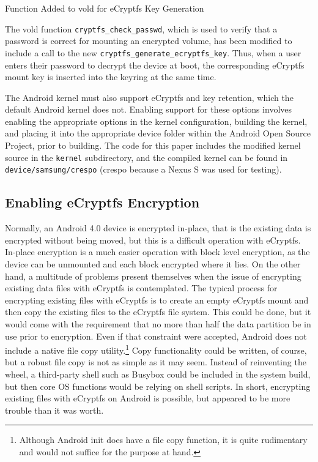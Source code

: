 \begin{table}[!htb]
 
\caption{Function Added to vold for eCryptfs Key Generation}
\label{tab:generate-key}
\end{table}

The vold function \texttt{cryptfs\_check\_passwd}, which is used to verify that a password is correct for mounting an
encrypted volume, has been modified to include a call to the new \texttt{cryptfs\_generate\_ecryptfs\_key}. Thus, when a user enters
their password to decrypt the device at boot, the corresponding eCryptfs mount key is inserted into the keyring at the same time.

The Android kernel must also support eCryptfs and key retention, which the default Android kernel does not. Enabling support for
these options involves enabling the appropriate options in the kernel configuration, building the kernel, and placing it into the
appropriate device folder within the Android Open Source Project, prior to building. The code for this paper includes the modified
kernel source in the \texttt{kernel} subdirectory, and the compiled kernel can be found in \texttt{device/samsung/crespo} (crespo
because a Nexus S was used for testing).

\subsection{Enabling eCryptfs Encryption} Normally, an Android 4.0 device is encrypted in-place, that is the existing data is
encrypted without being moved, but this is a difficult operation with eCryptfs. In-place encryption is a much easier operation with
block level encryption, as the device can be unmounted and each block encrypted where it lies. On the other hand, a multitude of
problems present themselves when the issue of encrypting existing data files with eCryptfs is contemplated.  The typical process for
encrypting existing files with eCryptfs is to create an empty eCryptfs mount and then copy the existing files to the eCryptfs file
system.  This could be done, but it would come with the requirement that no more than half the data partition be in use prior to
encryption. Even if that constraint were accepted, Android does not include a native file copy utility.\footnote{Although Android
init does have a file copy function, it is quite rudimentary and would not suffice for the purpose at hand.} Copy functionality could be
written, of course, but a robust file copy is not as simple as it may seem. Instead of reinventing the wheel, a third-party shell
such as Busybox could be included in the system build, but then core OS functions would be relying on shell scripts. In short, encrypting
existing files with eCryptfs on Android is possible, but appeared to be more trouble than it was worth.

